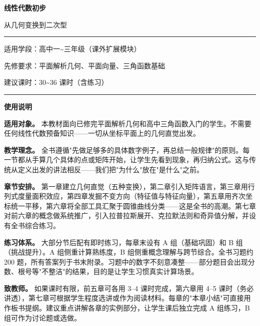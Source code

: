 \documentclass[a4paper,12pt]{ctexart}
\begin{document}
\pagestyle{empty}

\vspace*{2.5cm}
{\centering
  {\Huge\bfseries\color{mainblue} 线性代数初步}\par
  \vspace{0.6cm}
  {\Large 从几何变换到二次型}\par
  \vspace{2cm}
  \rule{0.5\textwidth}{0.4pt}\par
  \vspace{1.2cm}
  {\normalsize 适用学段：高中一\~{}三年级（课外扩展模块）}\par
  \vspace{0.4cm}
  {\normalsize 先修要求：平面解析几何、平面向量、三角函数基础}\par
  \vspace{0.4cm}
  {\normalsize 建议课时：30\~{}36 课时（含练习）}\par
  \vspace{1.2cm}
  \rule{0.5\textwidth}{0.4pt}
}
\newpage

\vspace*{0.5cm}
{\Large\bfseries\color{mainblue} 使用说明}\par
\vspace{0.3cm}

\textbf{适用对象。} 本教材面向已修完平面解析几何和高中三角函数入门的学生。不需要任何线性代数预备知识——一切从坐标平面上的几何直觉出发。

\textbf{教学理念。} 全书遵循"先做足够多的具体数字例子，再总结一般规律"的原则。每一节都从手算几个具体的点或矩阵开始，让学生先看到现象，再归纳公式。这与传统从定义出发的讲法相反——我们把"为什么"放在"是什么"之前。

\textbf{章节安排。} 第一章建立几何直觉（五种变换），第二章引入矩阵语言，第三章用行列式度量面积效应，第四章发掘不变方向（特征值与特征向量），第五章用齐次坐标统一平移，第六章将全部工具汇聚于圆锥曲线分类——这是全书的高潮。第七章对前六章的概念做系统推广，引入拉普拉斯展开、克拉默法则和奇异值分解，并设有全书综合练习。

\textbf{练习体系。} 大部分节后配有即时练习，每章末设有 A 组（基础巩固）和 B 组（挑战提升）。A 组侧重计算熟练度，B 组侧重概念理解与跨节综合。全书习题约 200 题，所有答案列于书末附录。习题中的数字不刻意凑整——部分题目会出现分数、根号等"不整洁"的结果，目的是让学生习惯真实计算场景。

\textbf{致教师。} 如果课时有限，前五章可各用 3--4 课时完成，第六章用 4--5 课时（务必讲透），第七章可根据学生程度选讲或作为阅读材料。每章的"本章小结"可直接用作板书提纲。建议重点讲解各章的实例部分，让学生课后独立完成 A 组练习，B 组可作为讨论题或选做。
\end{document}
